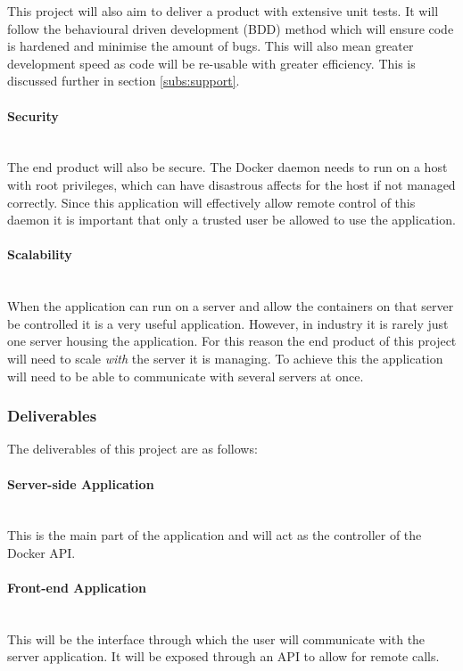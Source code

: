 This project will also aim to deliver a product with extensive unit tests. It will follow the behavioural driven development (BDD) method which will ensure code is hardened and minimise the amount of bugs. This will also mean greater development speed as code will be re-usable with greater efficiency. This is discussed further in section \ref{subs:support}.

\paragraph{Security}\mbox{}\\
The end product will also be secure. The Docker daemon needs to run on a host with root privileges, which can have disastrous affects for the host if not managed correctly. Since this application will effectively allow remote control of this daemon it is important that only a trusted user be allowed to use the application. 

\paragraph{Scalability}\mbox{}\\
When the application can run on a server and allow the containers on that server be controlled it is a very useful application. However, in industry it is rarely just one server housing the application. For this reason the end product of this project will need to scale \textit{with} the server it is managing. To achieve this the application will need to be able to communicate with several servers at once.

\subsubsection{Deliverables}
The deliverables of this project are as follows:

\paragraph{Server-side Application}\mbox{}\\
This is the main part of the application and will act as the controller of the Docker API.

\paragraph{Front-end Application}\mbox{}\\
This will be the interface through which the user will communicate with the server application. It will be exposed through an API to allow for remote calls.

